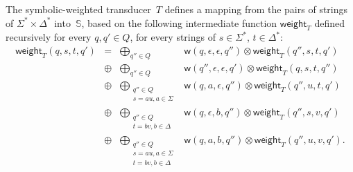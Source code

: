 \documentclass[runningheads]{llncs}
\newcommand{\Semiring}{\mathbb{S}}
\def\weight{\mathsf{weight}}
\def\wei{\mathsf{w}}
\begin{document}
\noindent
The symbolic-weighted transducer~$T$ defines a mapping 
from the pairs of strings of $\Sigma^* \times \Delta^*$ 
into~$\Semiring$,
based on the following intermediate function $\weight_T$
defined recursively for every $q, q' \in Q$, 
for every strings of $s \in \Sigma^*$, $t \in \Delta^*$:
\[
\begin{array}{rccl}
\weight_T(q, s, t, q') & = & 
   \displaystyle\bigoplus_{q'' \in Q} &
   \wei(q, \epsilon, \epsilon, q'') \otimes \weight_T(q'', s, t, q')\\
   & \oplus & \displaystyle\bigoplus_{q'' \in Q} &
              \wei(q'', \epsilon, \epsilon, q') \otimes \weight_T(q, s, t, q'')\\
 & \oplus & \displaystyle\bigoplus_{\begin{array}{c}
                                      \scriptstyle q'' \in Q\\[-2pt]
                                      \scriptstyle s = au, a \in \Sigma
                                      \end{array}} &
   \wei(q, a, \epsilon, q'') \otimes \weight_T(q'', u, t, q')\\
 & \oplus & \displaystyle\bigoplus_{\begin{array}{c}
                                    \scriptstyle q'' \in Q\\[-2pt]
                                    \scriptstyle t = bv, b \in \Delta
                                    \end{array}} &
    \wei(q, \epsilon, b, q'') \otimes \weight_T(q'', s, v, q')\\ 
 & \oplus & \displaystyle\bigoplus_{\begin{array}{c}
                                    \scriptstyle q'' \in Q\\[-2pt]
                                    \scriptstyle s = au, a \in \Sigma\\[-2pt]
                                    \scriptstyle t = bv, b \in \Delta
                                    \end{array}} &
   \wei(q, a, b, q'') \otimes \weight_T(q'', u, v, q').\\ 
\end{array}
\]
\end{document}
